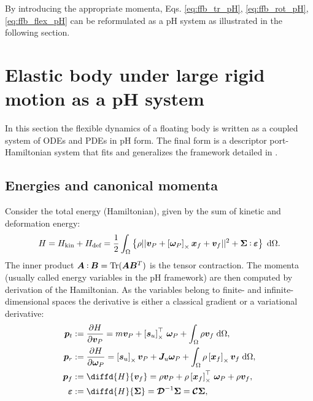 By introducing the appropriate momenta, Eqs. \eqref{eq:ffb_tr_pH}, \eqref{eq:ffb_rot_pH}, \eqref{eq:ffb_flex_pH} can be reformulated as a pH system as illustrated in the following section.


\section{Elastic body under large rigid motion as a pH system}
\label{sec:pH_fd}
In this section the flexible dynamics of a floating body is written as a coupled system of ODEs and PDEs in pH form. The final form is a descriptor port-Hamiltonian system that fits and generalizes the framework detailed in \cite{beattie2018linear,mehrmann2019structurepreserving}.  

\subsection{Energies and canonical momenta}
Consider the total energy (Hamiltonian), given by the sum of kinetic and deformation energy:
\begin{equation}
\label{eq:H}
H = H_{\text{kin}} + H_{\text{def}}= \frac{1}{2} \int_{\Omega} \left\{\rho ||\bm{v}_P + \crmat{\bm{\omega}_P} \bm{x}_f + {\bm{v}}_f||^2 + \bm\Sigma \cddot \bm\varepsilon \right\}  \d{\Omega}.
\end{equation}
The inner product $\bm{A} \cddot \bm{B} = \Tr(\bm{A} \bm{B}^T)$ is the tensor contraction.  
The momenta (usually called energy variables in the pH framework) are then computed by derivation of the Hamiltonian. As the variables belong to finite- and infinite-dimensional spaces the derivative is either a classical gradient or a variational derivative:
\begin{equation}
\label{eq:momenta}
\begin{aligned}
\bm{p}_t &:= \diffp{H}{\bm{v}_P} = m \bm{v}_P + \crmat{\bm{s}_u}^\top \, \bm\omega_P + \int_{\Omega} \rho \bm{v}_f \d{\Omega}, \\
\bm{p}_r &:= \diffp{H}{\bm\omega_P} = \crmat{\bm{s}_u} \bm{v}_P + \bm{J}_u \bm\omega_P + \int_{\Omega} \rho \crmat{\bm{x}_f} \bm{v}_f \d{\Omega}, \\
\bm{p}_f &:= \diffd{H}{\bm{v}_f} = \rho \bm{v}_P + \rho \crmat{\bm{x}_f}^\top \, \bm\omega_P + \rho \bm{v}_f, \\
\bm\varepsilon &:= \diffd{H}{\bm\Sigma} = \bm{\mathcal{D}}^{-1} \bm\Sigma= \bm{\mathcal{C}} \bm\Sigma,
\end{aligned}
\end{equation}
